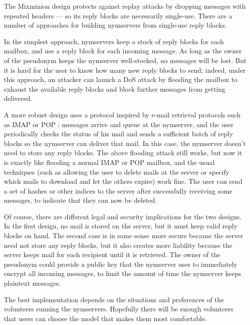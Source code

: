 \documentclass{llncs}
\begin{document}
The Mixminion design protects against replay attacks by dropping
messages with repeated headers --- so its reply blocks are necessarily
single-use. There are a number of approaches for building nymservers
from single-use reply blocks.

In the simplest approach, nymservers keep a stock of reply blocks for
each mailbox, and use a reply block for each incoming message. As long
as the owner of the pseudonym keeps the nymserver well-stocked, no
messages will be lost.  But it is hard for the user to know how many
new reply blocks to send; indeed, under this approach, an attacker can
launch a DoS attack by flooding the mailbox to exhaust the available
reply blocks and block further messages from getting delivered.

A more robust design uses a protocol inspired by e-mail retrieval
protocols such as IMAP \cite{IMAP} or POP \cite{POP3}:
messages arrive and queue at the nymserver, and the user periodically
checks the status of his mail and sends a sufficient batch of reply
blocks so the nymserver can deliver that mail. 
In this case, the nymserver doesn't need to store any reply blocks.
The above flooding attack still works, but now it is exactly
like flooding a normal IMAP or POP mailbox, and the usual techniques (such as
allowing the user to delete mails at the server or specify which mails to
download and let the others expire) work fine. The user can send a set
of hashes or other indices to the server after successfully receiving
some messages, to indicate that they can now be deleted.

Of course, there are different legal and security implications for the two
designs. In the first design, no mail is stored on the server, but it must
keep valid reply blocks on hand. The second case is in some sense more
secure because the server need not store any reply blocks, but it also
creates more liability because the server keeps mail for each recipient
until it is retrieved. The owner of the pseudonym could provide a public
key that the nymserver uses to immediately encrypt all incoming messages,
to limit the amount of time the nymserver keeps plaintext messages.

The best implementation depends on the situations and preferences of
the volunteers running the nymservers. Hopefully there will be enough
volunteers that users can choose the model that makes them most
comfortable.
\end{document}
